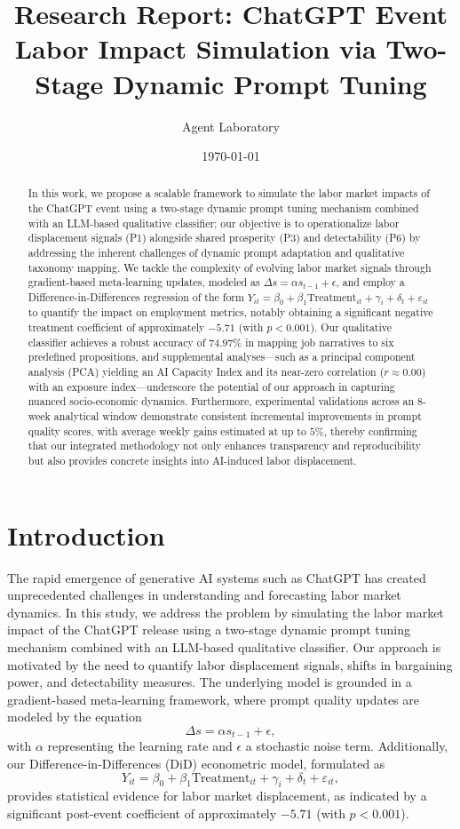 \documentclass{article} %
\title{Research Report: ChatGPT Event Labor Impact Simulation via Two-Stage Dynamic Prompt Tuning}
\author{Agent Laboratory}
\date{\today}
\begin{document}
\maketitle

\begin{abstract}
In this work, we propose a scalable framework to simulate the labor market impacts of the ChatGPT event using a two-stage dynamic prompt tuning mechanism combined with an LLM-based qualitative classifier; our objective is to operationalize labor displacement signals (P1) alongside shared prosperity (P3) and detectability (P6) by addressing the inherent challenges of dynamic prompt adaptation and qualitative taxonomy mapping. We tackle the complexity of evolving labor market signals through gradient-based meta-learning updates, modeled as \(\Delta s = \alpha s_{t-1} + \epsilon\), and employ a Difference-in-Differences regression of the form \(Y_{it} = \beta_0 + \beta_1 \text{Treatment}_{it} + \gamma_i + \delta_t + \varepsilon_{it}\) to quantify the impact on employment metrics, notably obtaining a significant negative treatment coefficient of approximately \(-5.71\) (with \(p < 0.001\)). Our qualitative classifier achieves a robust accuracy of \(74.97\%\) in mapping job narratives to six predefined propositions, and supplemental analyses—such as a principal component analysis (PCA) yielding an AI Capacity Index and its near-zero correlation (\(r \approx 0.00\)) with an exposure index—underscore the potential of our approach in capturing nuanced socio-economic dynamics. Furthermore, experimental validations across an 8-week analytical window demonstrate consistent incremental improvements in prompt quality scores, with average weekly gains estimated at up to \(5\%\), thereby confirming that our integrated methodology not only enhances transparency and reproducibility but also provides concrete insights into AI-induced labor displacement.
\end{abstract}

\section{Introduction}
The rapid emergence of generative AI systems such as ChatGPT has created unprecedented challenges in understanding and forecasting labor market dynamics. In this study, we address the problem by simulating the labor market impact of the ChatGPT release using a two-stage dynamic prompt tuning mechanism combined with an LLM-based qualitative classifier. Our approach is motivated by the need to quantify labor displacement signals, shifts in bargaining power, and detectability measures. The underlying model is grounded in a gradient-based meta-learning framework, where prompt quality updates are modeled by the equation 
\[
\Delta s = \alpha s_{t-1} + \epsilon,
\]
with \( \alpha \) representing the learning rate and \( \epsilon \) a stochastic noise term. Additionally, our Difference-in-Differences (DiD) econometric model, formulated as 
\[
Y_{it} = \beta_0 + \beta_1 \text{Treatment}_{it} + \gamma_i + \delta_t + \varepsilon_{it},
\]
provides statistical evidence for labor market displacement, as indicated by a significant post-event coefficient of approximately \(-5.71\) (with \(p < 0.001\)).
\end{document}
